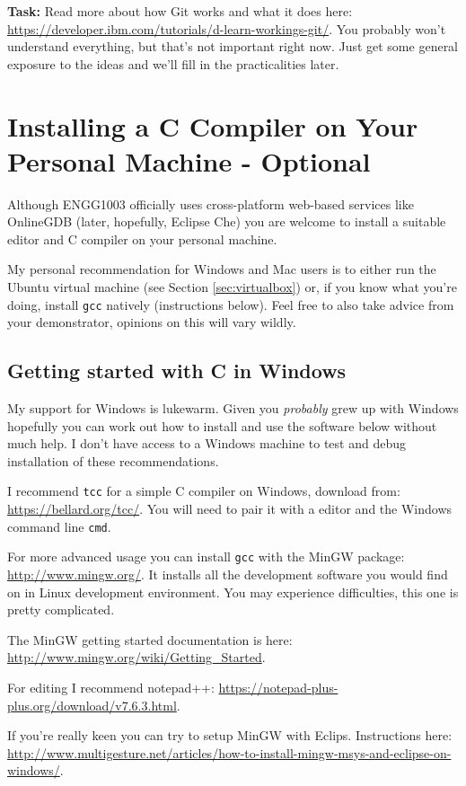 \documentclass{lab}
\begin{document}
\textbf{Task:} Read more about how Git works and what it does here: \url{https://developer.ibm.com/tutorials/d-learn-workings-git/}. You probably won't understand everything, but that's not important right now. Just get some general exposure to the ideas and we'll fill in the practicalities later.

\pagebreak
\section{Installing a C Compiler on Your Personal Machine - Optional}

Although ENGG1003 officially uses cross-platform web-based services like OnlineGDB (later, hopefully, Eclipse Che) you are welcome to install a suitable editor and C compiler on your personal machine.

My personal recommendation for Windows and Mac users is to either run the Ubuntu virtual machine (see Section \ref{sec:virtualbox}) or, if you know what you're doing, install \texttt{gcc} natively (instructions below). Feel free to also take advice from your demonstrator, opinions on this will vary wildly.

\subsection{Getting started with C in Windows}

My support for Windows is lukewarm. Given you \textit{probably} grew up with Windows hopefully you can work out how to install and use the software below without much help. I don't have access to a Windows machine to test and debug installation of these recommendations.

I recommend \texttt{tcc} for a simple C compiler on Windows, download from: \url{https://bellard.org/tcc/}. You will need to pair it with a editor and the Windows command line \texttt{cmd}.

For more advanced usage you can install \texttt{gcc} with the MinGW package: \url{http://www.mingw.org/}. It installs all the development software you would find on in Linux development environment. You may experience difficulties, this one is pretty complicated.

The MinGW getting started documentation is here: \url{http://www.mingw.org/wiki/Getting_Started}.

For editing I recommend notepad++: \url{https://notepad-plus-plus.org/download/v7.6.3.html}.

If you're really keen you can try to setup MinGW with Eclips. Instructions here: \url{http://www.multigesture.net/articles/how-to-install-mingw-msys-and-eclipse-on-windows/}.
\end{document}
